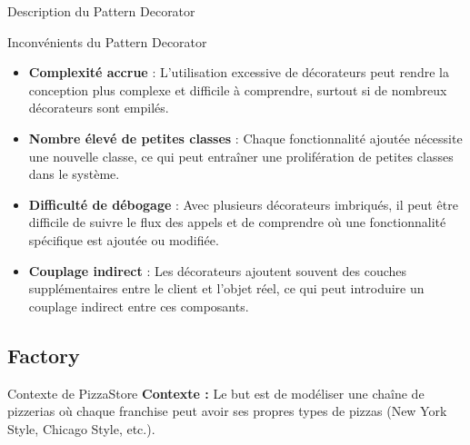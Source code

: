 \documentclass[aspectratio=169]{beamer}
\begin{document}
  \begin{frame}{Description du Pattern Decorator}
  \end{frame}

  \begin{frame}{Inconvénients du Pattern Decorator}
    \begin{itemize}
        \item \textbf{Complexité accrue} : L'utilisation excessive de décorateurs peut rendre la conception plus complexe et difficile à comprendre, surtout si de nombreux décorateurs sont empilés.
        \item \textbf{Nombre élevé de petites classes} : Chaque fonctionnalité ajoutée nécessite une nouvelle classe, ce qui peut entraîner une prolifération de petites classes dans le système.
        \item \textbf{Difficulté de débogage} : Avec plusieurs décorateurs imbriqués, il peut être difficile de suivre le flux des appels et de comprendre où une fonctionnalité spécifique est ajoutée ou modifiée.
        \item \textbf{Couplage indirect} : Les décorateurs ajoutent souvent des couches supplémentaires entre le client et l'objet réel, ce qui peut introduire un couplage indirect entre ces composants.
    \end{itemize}
  \end{frame}

  \subsection{Factory}
  \begin{frame}{Contexte de PizzaStore}
      \textbf{Contexte :} 
        Le but est de modéliser une chaîne de pizzerias où chaque franchise peut avoir ses propres types de pizzas (New York Style, Chicago Style, etc.).
  \end{frame}
    
\end{document}
